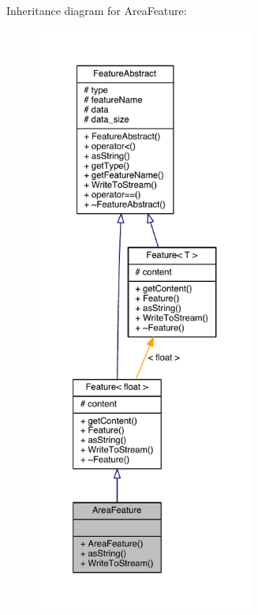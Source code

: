 Inheritance diagram for Area\+Feature\+:
\nopagebreak
\begin{figure}[H]
\begin{center}
\leavevmode
\includegraphics[height=550pt]{class_area_feature__inherit__graph}
\end{center}
\end{figure}


